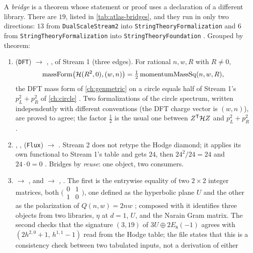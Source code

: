 A \emph{bridge} is a theorem whose statement or proof uses a declaration of a different
library. There are $19$, listed in \cref{tab:atlas-bridges}, and they run in only two
directions: $13$ from \texttt{DualScaleStream2} into \texttt{StringTheoryFormalization}
and $6$ from \texttt{StringTheoryFormalization} into \texttt{StringTheoryFoundation}
. Grouped by theorem:
\begin{enumerate}[leftmargin=*,itemsep=2pt]
\item {} (\texttt{DFT}) $\to$ ,
  ,  of Stream 1 (three edges). For rational
  $n,w,R$ with $R\ne0$,
  \[
    \mathrm{massForm}\bigl(\mathcal{H}(R^2,0),(w,n)\bigr)=\tfrac12\,\mathrm{momentumMassSq}(n,w,R),
  \]
  the DFT mass form of \cref{ch:genmetric} on a circle equals half of Stream 1's
  $p_L^2+p_R^2$ of \cref{ch:circle} .
  Two formalizations of the circle spectrum, written independently with different
  conventions (the DFT charge vector is $(w,n)$), are proved to agree; the factor
  $\tfrac12$ is the usual one between $Z^{\mathsf T}\mathcal{H} Z$ and $p_L^2+p_R^2$.
\item {}, , 
  (\texttt{Flux}) $\to$ . Stream 2 does not retype the Hodge diamond;
  it applies its own functional  to Stream 1's table and gets $24$,
  then $24^2/24=24$ and $24\cdot0=0$ . Bridges by
  \emph{reuse}: one object, two consumers.
\item {} $\to$ , and
   $\to$ , . The first
  is the entrywise equality of two $2\times2$ integer matrices, both
  $\bigl(\begin{smallmatrix}0&1\\1&0\end{smallmatrix}\bigr)$, one defined as the
  hyperbolic plane $U$ and the other as the polarization of $Q(n,w)=2nw$
  ; composed with 
  it identifies three objects from two libraries, $\eta$ at $d=1$, $U$, and the Narain
  Gram matrix. The second checks that the signature $(3,19)$ of $3U\oplus2E_8(-1)$
  agrees with $(2h^{2,0}+1,\,h^{1,1}-1)$ read from the Hodge table; the file states that
  this is a consistency check between two tabulated inputs, not a derivation of either

\end{enumerate}
